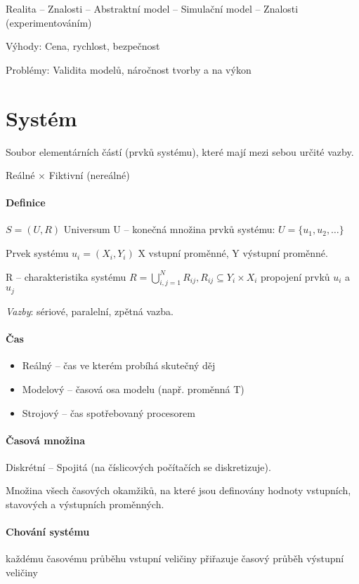\documentclass[a4paper, 11pt]{report}
\begin{document}
Realita -- Znalosti -- Abstraktní model -- Simulační model -- Znalosti (experimentováním)

Výhody: Cena, rychlost, bezpečnost

Problémy: Validita modelů, náročnost tvorby a na výkon

\section{Systém}
Soubor elementárních částí (prvků systému), které mají mezi sebou určité vazby.

Reálné $\times$ Fiktivní (nereálné)

\paragraph{Definice}
$S = (U, R)$ Universum U -- konečná množina prvků systému: $U = \{u_1, u_2, \dots \}$

Prvek systému $u_i = (X_i, Y_i)$ X vstupní proměnné, Y výstupní proměnné.

R -- charakteristika systému $R = \bigcup^N_{i,j = 1} R_{ij}, R_{ij} \subseteq Y_i \times X_i$ propojení prvků $u_i$ a $u_j$

\emph{Vazby}: sériové, paralelní, zpětná vazba.

\paragraph{Čas}
\begin{itemize}
	\item Reálný -- čas ve kterém probíhá skutečný děj
	\item Modelový -- časová osa modelu (např. proměnná T)
	\item Strojový -- čas spotřebovaný procesorem
\end{itemize}

\paragraph{Časová množina}
Diskrétní -- Spojitá (na číslicových počítačích se diskretizuje).

Množina všech časových okamžiků, na které jsou definovány hodnoty vstupních, stavových a výstupních proměnných.

\paragraph{Chování systému}
každému časovému průběhu vstupní veličiny přiřazuje časový průběh výstupní veličiny
\end{document}
